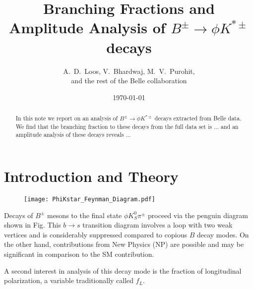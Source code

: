 \documentclass[11pt]{article}
\begin{document}

\title{{\large \bf Branching Fractions and Amplitude Analysis of $B^\pm\to\phi K^{*\pm}$ decays}}
\author{A.~D.~Loos, V.~Bhardwaj, M.~V.~Purohit, \\
  and the rest of the Belle collaboration}
\date{\today}%
\maketitle
\thispagestyle{empty}

\begin{abstract}
  In this note we report on an analysis of $B^\pm\to\phi K^{*\pm}$
  decays extracted from Belle data. We find that the branching fraction
  to these decays from the full data set is ... and an amplitude analysis of these decays reveals ...
\end{abstract}

\newpage
\tableofcontents
{}
\pagestyle{headings}
\newpage

\section{Introduction and Theory}

\begin{figure}[!th]
  \centering
  \texttt{[image: PhiKstar\_Feynman\_Diagram.pdf]}
\end{figure}

Decays of $B^\pm$ mesons to the final state $\phi K^0_S \pi^\pm$ proceed
via the penguin diagram shown in Fig.%
This $b\to s$
transition diagram involves a loop with two weak vertices and is
considerably suppressed compared to copious $B$ decay modes. On the
other hand, contributions from New Physics (NP) are possible and may be
significant in comparison to the SM contribution.%

A second interest in analysis of this decay mode is the fraction of
longitudinal polarization, a variable traditionally called $f_L$.


\end{document}
